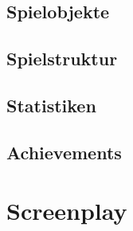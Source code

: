 \documentclass[12pt]{article}
\begin{document}
\subsection{Spielobjekte}

\subsection{Spielstruktur}

\subsection{Statistiken}

\subsection{Achievements}


\section{Screenplay}
\end{document}
